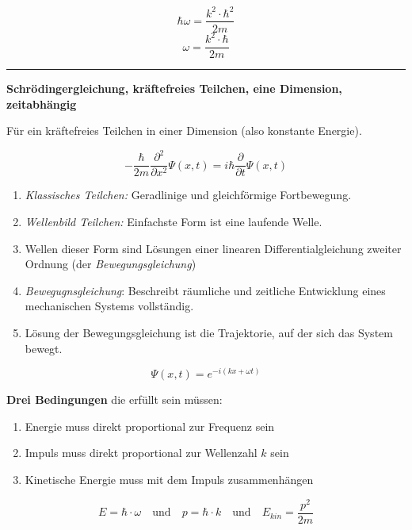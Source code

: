 \documentclass{article}
\begin{document}
\begin{equation}
    \hbar \omega = \frac{k^2\cdot \hbar^2}{2m}
\end{equation}
\begin{equation}
    \omega = \frac{k^2\cdot \hbar}{2m}
\end{equation}

\hrule
\vspace{0.5cm}

\textbf{Schrödingergleichung, kräftefreies Teilchen, eine Dimension, zeitabhängig}

Für ein kräftefreies Teilchen in einer Dimension (also konstante Energie). 

\begin{equation}
-\frac{\hbar}{2m} \frac{\partial^2}{\partial x^2}\Psi(x,t) = i\hbar\frac{\partial}{\partial t} \Psi(x,t)
\end{equation}

\begin{enumerate}
    \item \textit{Klassisches Teilchen:} Geradlinige und gleichförmige Fortbewegung.
    \item \textit{Wellenbild Teilchen:} Einfachste Form ist eine laufende Welle.
    \item Wellen dieser Form sind Lösungen einer linearen Differentialgleichung zweiter Ordnung (der \textit{Bewegungsgleichung})
    \item \textit{Bewegugnsgleichung}: Beschreibt räumliche und zeitliche Entwicklung eines mechanischen Systems vollständig.
    \item Lösung der Bewegungsgleichung ist die Trajektorie, auf der sich das System bewegt. 
\end{enumerate}

\begin{equation}
   \Psi(x,t) = e^{-i(kx + \omega t)}
\end{equation}

\textbf{Drei Bedingungen} die erfüllt sein müssen:

\begin{enumerate}
    \item Energie muss direkt proportional zur Frequenz sein
    \item Impuls muss direkt proportional zur Wellenzahl $k$ sein
    \item Kinetische Energie muss mit dem Impuls zusammenhängen
\end{enumerate}

\begin{equation}
   E = \hbar \cdot \omega 
   \quad\text{und}\quad
   p = \hbar \cdot k 
   \quad\text{und}\quad
   E_{kin} = \frac{p^2}{2m}  
\end{equation}
\end{document}
